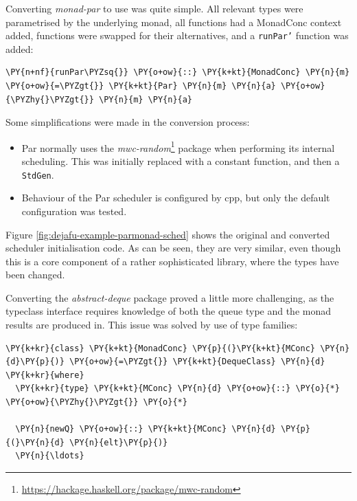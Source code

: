 Converting \textit{monad-par} to use \dejafu{} was quite simple. All
relevant types were parametrised by the underlying monad, all
functions had a MonadConc context added, functions were swapped for
their \dejafu{} alternatives, and a \texttt{runPar'} function was
added:


\begin{Verbatim}[commandchars=\\\{\}]
\PY{n+nf}{runPar\PYZsq{}} \PY{o+ow}{::} \PY{k+kt}{MonadConc} \PY{n}{m} \PY{o+ow}{=\PYZgt{}} \PY{k+kt}{Par} \PY{n}{m} \PY{n}{a} \PY{o+ow}{\PYZhy{}\PYZgt{}} \PY{n}{m} \PY{n}{a}
\end{Verbatim}

Some simplifications were made in the conversion process:

\begin{itemize}
  \item Par normally uses the
    \textit{mwc-random}\footnote{\url{https://hackage.haskell.org/package/mwc-random}}
    package when performing its internal scheduling. This was
    initially replaced with a constant function, and then a
    \texttt{StdGen}.

  \item Behaviour of the Par scheduler is configured by cpp, but only
    the default configuration was tested.
\end{itemize}

Figure \ref{fig:dejafu-example-parmonad-sched} shows the original and
converted scheduler initialisation code. As can be seen, they are very
similar, even though this is a core component of a rather
sophisticated library, where the types have been changed.

Converting the \textit{abstract-deque} package proved a little more
challenging, as the typeclass interface requires knowledge of both the
queue type and the monad results are produced in. This issue was
solved by use of type families:



\begin{Verbatim}[commandchars=\\\{\}]
\PY{k+kr}{class} \PY{k+kt}{MonadConc} \PY{p}{(}\PY{k+kt}{MConc} \PY{n}{d}\PY{p}{)} \PY{o+ow}{=\PYZgt{}} \PY{k+kt}{DequeClass} \PY{n}{d} \PY{k+kr}{where}
  \PY{k+kr}{type} \PY{k+kt}{MConc} \PY{n}{d} \PY{o+ow}{::} \PY{o}{*} \PY{o+ow}{\PYZhy{}\PYZgt{}} \PY{o}{*}

  \PY{n}{newQ} \PY{o+ow}{::} \PY{k+kt}{MConc} \PY{n}{d} \PY{p}{(}\PY{n}{d} \PY{n}{elt}\PY{p}{)}
  \PY{n}{\ldots}
\end{Verbatim}

